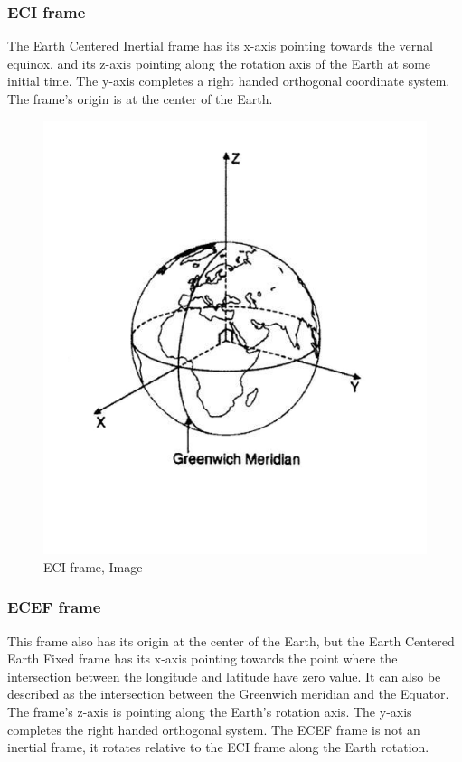 \documentclass[12pt,a4paper,oneside]{article}
\begin{document}
\subsubsection{ECI frame}
The Earth Centered Inertial frame has its x-axis pointing towards the vernal equinox, and its z-axis pointing along the rotation axis of the Earth at some initial time. The y-axis completes a right handed orthogonal coordinate system. The frame’s origin is at the center
of the Earth.
\citet{larson1992space}
\begin{figure}[ht]
\includegraphics[scale=0.4]{eci_frame.jpg}
\centering
\caption{ECI frame, Image \citet{larson1992space}}
\label{fig:eci_frame}
\end{figure}
\subsubsection{ECEF frame}
This frame also has its origin at the center of the Earth, but the Earth Centered Earth Fixed frame has its x-axis pointing towards the point where the intersection between the longitude and latitude have zero value. It can also be described as the intersection between the Greenwich meridian and the Equator. The frame’s z-axis is pointing along the Earth’s rotation axis. The y-axis completes the right handed orthogonal system. The ECEF frame is not an inertial frame, it rotates relative to the ECI frame along the Earth rotation.
\end{document}
